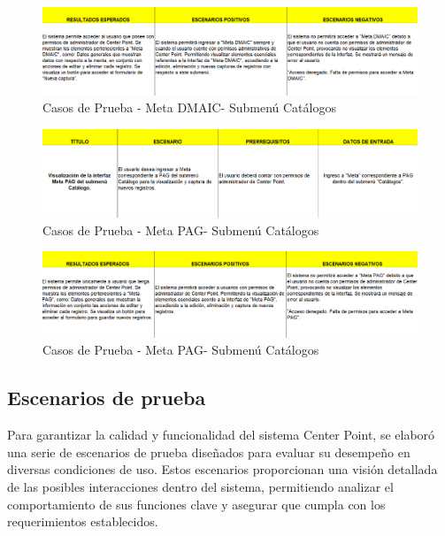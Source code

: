 \documentclass[12pt,letterpaper,spanish, xcolor=table]{report}
\numberwithin{figure}{subsection}
\begin{document}
	\begin{figure}[H]
		\centering
		\includegraphics[width=1.0\textwidth]
		{Imagenes/CenterPoint/CPDMAIC2.png}
		\caption{Casos de Prueba - Meta DMAIC- Submenú Catálogos}\label{a3}
	\end{figure}
	
	\begin{figure}[H]
		\centering
		\includegraphics[width=1.0\textwidth]
		{Imagenes/CenterPoint/CPPAG.png}
		\caption{Casos de Prueba - Meta PAG- Submenú Catálogos}\label{a3}
	\end{figure}
	
	\begin{figure}[H]
		\centering
		\includegraphics[width=1.0\textwidth]
		{Imagenes/CenterPoint/CPPAG2.png}
		\caption{Casos de Prueba - Meta PAG- Submenú Catálogos}\label{a3}
	\end{figure}
	
	\newpage
	
\subsection{Escenarios de prueba}

	Para garantizar la calidad y funcionalidad del sistema Center Point, se elaboró una serie de escenarios de prueba diseñados para evaluar su desempeño en diversas condiciones de uso. Estos escenarios proporcionan una visión detallada de las posibles interacciones dentro del sistema, permitiendo analizar el comportamiento de sus funciones clave y asegurar que cumpla con los requerimientos establecidos.\\
	
\end{document}
